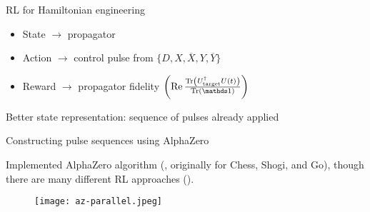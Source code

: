 \documentclass{beamer}
\begin{document}
\begin{frame}{RL for Hamiltonian engineering}
%

\begin{itemize}
    \item State $\to$ propagator
    \item Action $\to$ control pulse from $\{ D, X, \overline{X}, Y, \overline{Y} \}$
    \item Reward $\to$ propagator fidelity $\left(\Re{
        \frac{\Tr{U_\text{target}^\dagger U(t)}}{\Tr{\identity}}
    }\right)$
\end{itemize}

Better state representation: sequence of pulses already applied



\end{frame}


\begin{frame}{Constructing pulse sequences using AlphaZero}

Implemented AlphaZero algorithm (\cite{Silver1140}, originally for Chess, Shogi, and Go), though there are many different RL approaches (\cite{peng2021deep}).

\begin{figure}
\centering
\texttt{[image: az-parallel.jpeg]}
\end{figure}


\end{frame}
\end{document}
